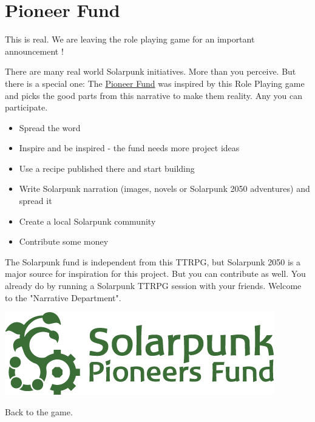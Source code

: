 \chapter{Pioneer Fund}
\label{ch:pioneer fund}

This is real. We are leaving the role playing game for an important announcement !

There are many real world Solarpunk initiatives. More than you perceive. But there is a special one: The \href{https://www.solarpunk-pioneers.org/}{Pioneer Fund} was inspired by this Role Playing game and picks the good parts from this narrative to make them reality. Any you can participate.

\begin{itemize}
    \item {Spread the word}
    \item {Inspire and be inspired - the fund needs more project ideas}
    \item {Use a recipe published there and start building}
    \item {Write Solarpunk narration (images, novels or Solarpunk 2050 adventures) and spread it}
    \item {Create a local Solarpunk community}
    \item {Contribute some money }
\end{itemize}

The Solarpunk fund is independent from this TTRPG, but Solarpunk 2050 is a major source for inspiration for this project. But you can contribute as well. You already do by running a Solarpunk TTRPG session with your friends.
Welcome to the "Narrative Department".
\begin{center}
    \href{https://www.solarpunk-pioneers.org/}{
    \includegraphics[scale=0.5]{static/SPF_logo_wide.png}
    }
\end{center}

Back to the game.